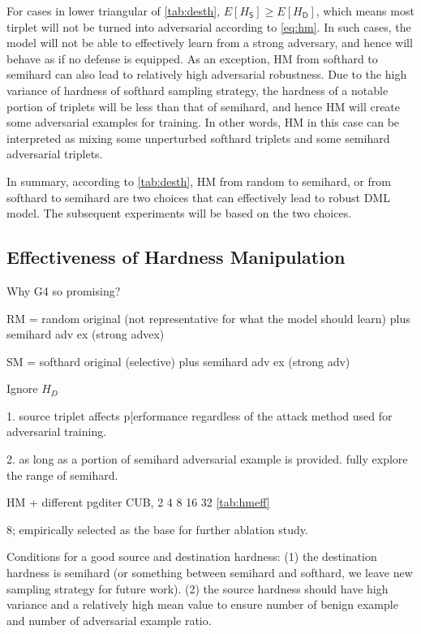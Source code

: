 \documentclass[10pt,twocolumn,letterpaper]{article}
\begin{document}
For cases in lower triangular of \cref{tab:desth}, $E[H_\mathsf{S}] \geqslant E[H_\mathsf{D}]$,
which means most tirplet will not be turned into adversarial according to
\cref{eq:hm}.
%
In such cases, the model will not be able to effectively learn from a strong
adversary, and hence will behave as if no defense is equipped.
%
As an exception, HM from softhard to semihard can also lead to relatively high
adversarial robustness.
%
Due to the high variance of hardness of softhard sampling strategy, the
hardness of a notable portion of triplets will be less than that of semihard,
and hence HM will create some adversarial examples for training.
%
In other words, HM in this case can be interpreted as mixing some unperturbed
softhard triplets and some semihard adversarial triplets.


In summary, according to \cref{tab:desth}, HM from random to semihard, or from
softhard to semihard are two choices that can effectively lead to robust
DML model.
%
The subsequent experiments will be based on the two choices.

\subsection{Effectiveness of Hardness Manipulation}
\label{sec:42}

Why G4 so promising?

RM = random original (not representative for what the model should learn) plus semihard adv ex (strong advex)

SM = softhard original (selective) plus semihard adv ex (strong adv)

Ignore $H_D$

1. source triplet affects p[erformance regardless of the attack method used for adversarial training.

2. as long as a portion of semihard adversarial example is provided. fully explore the range of semihard.


HM + different pgditer
CUB, 2 4 8 16 32
\cref{tab:hmeff}

8; empirically selected as the base for further ablation study.

Conditions for a good source and destination hardness:
%
(1) the destination hardness is semihard (or something between semihard
and softhard, we leave new sampling strategy for future work).
(2) the source hardness should have high variance and a relatively high mean
value to ensure number of benign example and number of adversarial example ratio.
\end{document}
